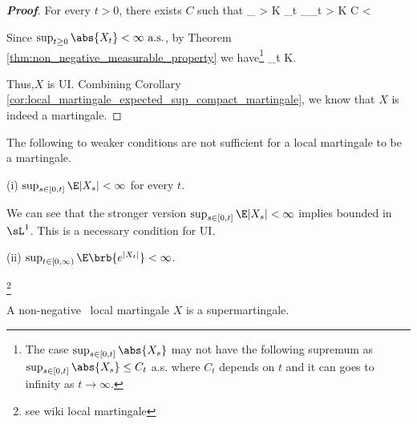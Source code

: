 \begin{proof}[\bf Proof]
For every $t>0$, there exists $C$ such that %
\be
{} \ind_{ > K} \leq \sup_{t}  \ind_{\sup_{t}  > K} \leq C < \infty \quad {}%
\ee

Since $\sup_{t\geq 0} \abs{X_t} < \infty \text{ a.s.}$, by Theorem \ref{thm:non_negative_measurable_property} we have\footnote{The case $\sup_{s\in [0,t]} \abs{X_s}$ may not have the following
supremum as $\sup_{s\in [0,t]} \abs{X_s} \leq C_t$ a.s. where $C_t$ depends on $t$ and it can goes to infinity as $t\to\infty$.}
\be
\sup_{t}\E{} \leq \E{}  \quad  {}K\to \infty.
\ee

Thus,$X$ is UI. Combining Corollary \ref{cor:local_martingale_expected_sup_compact_martingale}, we know that $X$ is indeed a martingale.%
\end{proof}



\begin{remark}
The following to weaker conditions are not sufficient for a local martingale to be a martingale.
\ben
\item [(i)] $\sup_{s\in[0,t]} \E |X_s| < \infty$ for every $t$.

We can see that the stronger version $\sup_{s\in[0,t]} \E |X_s| < \infty$ implies bounded in $\sL^1$. This is a necessary condition for UI.

\item [(ii)] $\sup_{t\in[0,\infty)} \E \brb{e^{|X_t|}} < \infty$.
\een
\end{remark}

\begin{example}
\footnote{see wiki local martingale}
\end{example}


\begin{theorem}
A non-negative \cadlag\ local martingale $X$ is a supermartingale.
\end{theorem}

